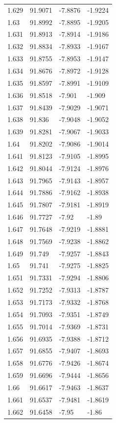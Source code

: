 \begin{tabular}{llll}
1.629 & 91.9071 & -7.8876 & -1.9224 \\
1.63 & 91.8992 & -7.8895 & -1.9205 \\
1.631 & 91.8913 & -7.8914 & -1.9186 \\
1.632 & 91.8834 & -7.8933 & -1.9167 \\
1.633 & 91.8755 & -7.8953 & -1.9147 \\
1.634 & 91.8676 & -7.8972 & -1.9128 \\
1.635 & 91.8597 & -7.8991 & -1.9109 \\
1.636 & 91.8518 & -7.901 & -1.909 \\
1.637 & 91.8439 & -7.9029 & -1.9071 \\
1.638 & 91.836 & -7.9048 & -1.9052 \\
1.639 & 91.8281 & -7.9067 & -1.9033 \\
1.64 & 91.8202 & -7.9086 & -1.9014 \\
1.641 & 91.8123 & -7.9105 & -1.8995 \\
1.642 & 91.8044 & -7.9124 & -1.8976 \\
1.643 & 91.7965 & -7.9143 & -1.8957 \\
1.644 & 91.7886 & -7.9162 & -1.8938 \\
1.645 & 91.7807 & -7.9181 & -1.8919 \\
1.646 & 91.7727 & -7.92 & -1.89 \\
1.647 & 91.7648 & -7.9219 & -1.8881 \\
1.648 & 91.7569 & -7.9238 & -1.8862 \\
1.649 & 91.749 & -7.9257 & -1.8843 \\
1.65 & 91.741 & -7.9275 & -1.8825 \\
1.651 & 91.7331 & -7.9294 & -1.8806 \\
1.652 & 91.7252 & -7.9313 & -1.8787 \\
1.653 & 91.7173 & -7.9332 & -1.8768 \\
1.654 & 91.7093 & -7.9351 & -1.8749 \\
1.655 & 91.7014 & -7.9369 & -1.8731 \\
1.656 & 91.6935 & -7.9388 & -1.8712 \\
1.657 & 91.6855 & -7.9407 & -1.8693 \\
1.658 & 91.6776 & -7.9426 & -1.8674 \\
1.659 & 91.6696 & -7.9444 & -1.8656 \\
1.66 & 91.6617 & -7.9463 & -1.8637 \\
1.661 & 91.6537 & -7.9481 & -1.8619 \\
1.662 & 91.6458 & -7.95 & -1.86 \\

\end{tabular}
